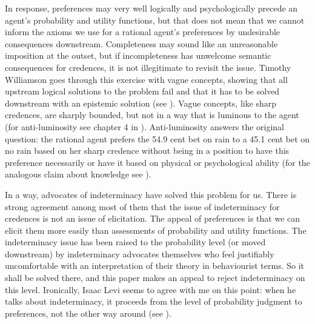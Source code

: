 In response, preferences may very well logically and
psychologically precede an agent's probability and
utility functions, but that does not mean that we
cannot inform the axioms we use for a rational agent's
preferences by undesirable consequences downstream.
Completeness may sound like an unreasonable imposition
at the outset, but if incompleteness has unwelcome
semantic consequences for credences, it is not
illegitimate to revisit the issue. Timothy Williamson
goes through this exercise with vague concepts, showing
that all upstream logical solutions to the problem fail
and that it has to be solved downstream with an
epistemic solution (see ).
Vague concepts, like sharp credences, are sharply
bounded, but not in a way that is luminous to the agent
(for anti-luminosity see chapter 4 in
). Anti-luminosity answers the
original question: the rational agent prefers the 54.9
cent bet on rain to a 45.1 cent bet on no rain based on
her sharp credence without being in a position to have
this preference necessarily or have it based on
physical or psychological ability (for the analogous
claim about knowledge see ).

In a way, advocates of indeterminacy have solved this
problem for us. There is strong agreement among most of
them that the issue of indeterminacy for credences is
not an issue of elicitation. The appeal of preferences
is that we can elicit them more easily than assessments
of probability and utility functions. The indeterminacy
issue has been raised to the probability level (or
moved downstream) by indeterminacy advocates themselves
who feel justifiably uncomfortable with an
interpretation of their theory in behaviourist terms.
So it shall be solved there, and this paper makes an
appeal to reject indeterminacy on this level.
Ironically, Isaac Levi seems to agree with me on this
point: when he talks about indeterminacy, it proceeds
from the level of probability judgment to preferences,
not the other way around (see ).


